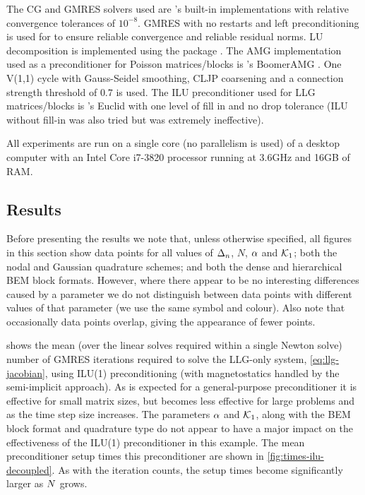 The CG and GMRES solvers used are \oomph's built-in implementations with relative convergence tolerances of $10^{-8}$.
GMRES with no restarts and left preconditioning is used for to ensure reliable convergence and reliable residual norms.
LU decomposition is implemented using the \superlu package \cite{superlu}.
The AMG implementation used as a preconditioner for Poisson matrices/blocks is \hypre's BoomerAMG \cite{hypre}.
One V(1,1) cycle with Gauss-Seidel smoothing, CLJP coarsening and a connection strength threshold of $0.7$ is used.
The ILU preconditioner used for LLG matrices/blocks is \hypre's Euclid with one level of fill in and no drop tolerance (ILU without fill-in was also tried but was extremely ineffective).


All experiments are run on a single core (\ie no parallelism is used) of a desktop computer with an Intel Core i7-3820 processor running at 3.6GHz and 16GB of RAM.


\subsection{Results}

Before presenting the results we note that, unless otherwise specified, all figures in this section show data points for all values of $\Delta_{n}$, $N$, $\alpha$ and $\mathcal{K}_1$; both the nodal and Gaussian quadrature schemes; and both the dense and hierarchical BEM block formats.
However, where there appear to be no interesting differences caused by a parameter we do not distinguish between data points with different values of that parameter (\ie we use the same symbol and colour).
Also note that occasionally data points overlap, giving the appearance of fewer points.

 shows the mean (over the linear solves required within a single Newton solve) number of GMRES iterations required to solve the LLG-only system, \cref{eq:llg-jacobian}, using ILU(1) preconditioning (\ie with magnetostatics handled by the semi-implicit approach).
As is expected for a general-purpose preconditioner it is effective for small matrix sizes, but becomes less effective for large problems and as the time step size increases.
The parameters $\alpha$ and $\mathcal{K}_1$, along with the BEM block format and quadrature type do not appear to have a major impact on the effectiveness of the ILU(1) preconditioner in this example.
The mean preconditioner setup times this preconditioner are shown in \cref{fig:times-ilu-decoupled}.
As with the iteration counts, the setup times become significantly larger as $N$ grows.

